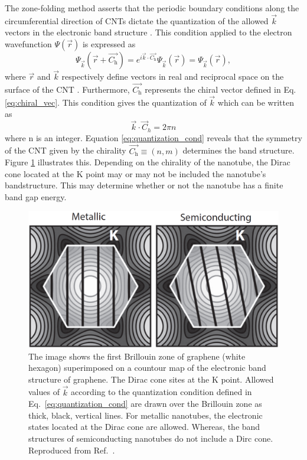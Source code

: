 The zone-folding method asserts that the periodic boundary conditions along the circumferential direction of CNTs dictate the quantization of the allowed $\vec{k}$ vectors in the electronic band structure \cite{charlier2007electronic}. This condition applied to the electron wavefunction $\Psi(\vec{r})$ is expressed as
\begin{equation}
\Psi_{\vec{k}}(\vec{r} + \vec{C_\text{h}}) = e^{i \vec{k} \cdot \vec{C_\text{h}}} \Psi_{\vec{k}}(\vec{r}) = \Psi_{\vec{k}}(\vec{r}),
\label{eq:boundary_cond}
\end{equation}
where $\vec{r}$ and $\vec{k}$ respectively define vectors in real and reciprocal space on the surface of the CNT \cite{charlier2007electronic}. Furthermore, $\vec{C_\text{h}}$ represents the chiral vector defined in Eq. \ref{eq:chiral_vec}. This condition gives the quantization of $\vec{k}$ which can be written as
\begin{equation}
	\vec{k} \cdot \vec{C}_h = 2\pi n
	\label{eq:quantization_cond}
\end{equation}
where n is an integer. Equation \ref{eq:quantization_cond} reveals that the symmetry of the CNT given by the chirality $\vec{C_\text{h}} \equiv (n,m)$ determines the band structure. Figure \ref{fig:k_quant} illustrates this. Depending on the chirality of the nanotube, the Dirac cone located at the K point may or may not be included the nanotube's bandstructure. This may determine whether or not the nanotube has a finite band gap energy.

\begin{figure}[h]
	\centering
	\includegraphics[scale=0.4]{images/chapter_optical_props/metal_semi_amori}
	\caption{The image shows the first Brillouin zone of graphene (white hexagon) superimposed on a countour map of the electronic band structure of graphene. The Dirac cone sites at the K point. Allowed values of $\vec{k}$ according to the quantization condition defined in Eq.\ \ref{eq:quantization_cond} are drawn over the Brillouin zone as thick, black, vertical lines. For metallic nanotubes, the electronic states located at the Dirac cone are allowed. Whereas, the band structures of semiconducting nanotubes do not include a Dirc cone. Reproduced from Ref.\ \cite{amori2018excitons}.}
	\label{fig:k_quant}
\end{figure}


